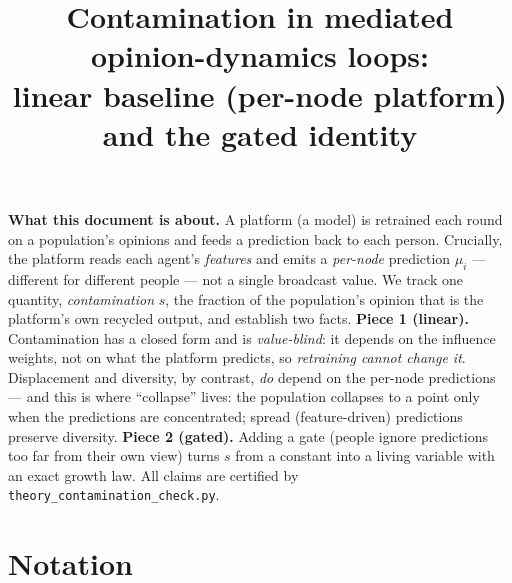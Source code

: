 \documentclass[11pt]{article}
\title{Contamination in mediated opinion-dynamics loops:\\
linear baseline (per-node platform) and the gated identity}
\author{}
\date{}
\theoremstyle{definition}
\begin{document}
\maketitle

\noindent\textbf{What this document is about.}
A platform (a model) is retrained each round on a population's opinions and feeds a
prediction back to each person. Crucially, the platform reads each agent's
\emph{features} and emits a \emph{per-node} prediction $\mu_i$ --- different for
different people --- not a single broadcast value. We track one quantity,
\emph{contamination} $s$, the fraction of the population's opinion that is the
platform's own recycled output, and establish two facts. \textbf{Piece 1 (linear).}
Contamination has a closed form and is \emph{value-blind}: it depends on the influence
weights, not on what the platform predicts, so \emph{retraining cannot change it}.
Displacement and diversity, by contrast, \emph{do} depend on the per-node predictions
--- and this is where ``collapse'' lives: the population collapses to a point only when
the predictions are concentrated; spread (feature-driven) predictions preserve
diversity. \textbf{Piece 2 (gated).} Adding a gate (people ignore predictions too far
from their own view) turns $s$ from a constant into a living variable with an exact
growth law. All claims are certified by \texttt{theory\_contamination\_check.py}.

\section{Notation}
\end{document}
